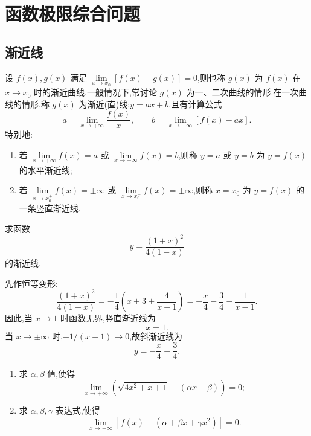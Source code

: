 \newpage

\section{函数极限综合问题}


\subsection{渐近线}

设 $f(x),g(x)$ 满足
$\displaystyle\lim\limits_{x\to x_0}[f(x)-g(x)]=0$,则也称 $g(x)$ 为 $f(x)$ 在 $x\to x_0$ 时的渐近曲线.一般情况下,常讨论 $g(x)$ 为一、二次曲线的情形.在一次曲线的情形,称 $g(x)$ 为渐近(直)线:$y=ax+b$.且有计算公式
\[
    a=\lim\limits_{x\to+\infty}\dfrac{f(x)}{x},
    \qquad
    b=\lim\limits_{x\to+\infty}[f(x)-ax].
\]
特别地:
\begin{enumerate}
    \item 若 $\displaystyle\lim\limits_{x\to+\infty}f(x)=a$ 或
          $\displaystyle\lim\limits_{x\to-\infty}f(x)=b$,则称 $y=a$ 或 $y=b$ 为 $y=f(x)$ 的水平渐近线;
    \item 若 $\displaystyle\lim\limits_{x\to x_0^+}f(x)=\pm\infty$ 或
          $\displaystyle\lim\limits_{x\to x_0^-}f(x)=\pm\infty$,则称 $x=x_0$ 为 $y=f(x)$ 的一条竖直渐近线.
\end{enumerate}

\begin{example}
    求函数
    \[
        y=\dfrac{(1+x)^2}{4(1-x)}
    \]
    的渐近线.
\end{example}
\exampleblank

\begin{solution}
    先作恒等变形:
    \[
        \dfrac{(1+x)^2}{4(1-x)}
        =-\dfrac{1}{4}\left(x+3+\dfrac{4}{x-1}\right)
        =-\dfrac{x}{4}-\dfrac{3}{4}-\dfrac{1}{x-1}.
    \]
    因此,当 $x\to1$ 时函数无界,竖直渐近线为
    \[
        x=1.
    \]
    当 $x\to\pm\infty$ 时,$-1/(x-1)\to0$,故斜渐近线为
    \[
        y=-\dfrac{x}{4}-\dfrac{3}{4}.
    \]
\end{solution}

\begin{example}
    \begin{enumerate}
        \item 求 $\alpha,\beta$ 值,使得
              \[
                  \lim\limits_{x\to+\infty}
                  \left(\sqrt{4x^2+x+1}-(\alpha x+\beta)\right)=0;
              \]
        \item 求 $\alpha,\beta,\gamma$ 表达式,使得
              \[
                  \lim\limits_{x\to+\infty}
                  [f(x)-(\alpha+\beta x+\gamma x^2)]=0.
              \]
    \end{enumerate}
\end{example}
\exampleblank


